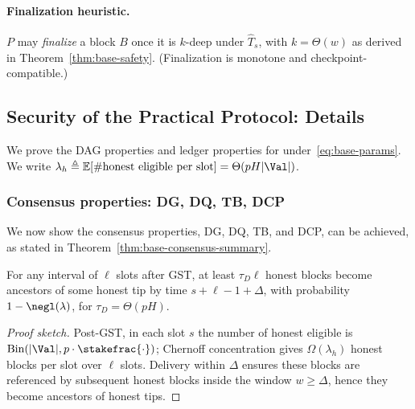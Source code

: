 \paragraph{Finalization heuristic.}
$P$ may \emph{finalize} a block $B$ once it is $k$-deep under $\hat T_s$, with $k=\Theta(w)$ as derived in Theorem~\ref{thm:base-safety}. (Finalization is monotone and checkpoint-compatible.)




\subsection{Security of the Practical Protocol: Details}
\label{app:base-security}
We prove the DAG properties and ledger properties for \ProjBase under~\eqref{eq:base-params}. We write $\lambda_h \triangleq \mathbb{E}[\#\text{honest eligible per slot}]=\Theta(pH|\Val|)$.


\subsubsection{Consensus properties: DG, DQ, TB, DCP}


We now show  the consensus properties, DG, DQ, TB, and DCP, can be achieved, as stated in Theorem~\ref{thm:base-consensus-summary}. 

\begin{theorem}
\label{thm:base-DG}
For any interval of $\ell$ slots after GST, at least $\tau_D\ell$ honest blocks become ancestors of some honest tip by time $s{+}\ell{-}1{+}\Delta$, with probability $1-\negl(\lambda)$, for $\tau_D=\Theta(pH)$.
\end{theorem}
\begin{proof}[Proof sketch]
Post-GST, in each slot $s$ the number of honest eligible is $\mathrm{Bin}(|\Val|,p\cdot \stakefrac{\cdot})$; Chernoff concentration gives $\Omega(\lambda_h)$ honest blocks per slot over $\ell$ slots. Delivery within $\Delta$ ensures these blocks are referenced by subsequent honest blocks inside the window $w\ge \Delta$, hence they become ancestors of honest tips.
\end{proof}

